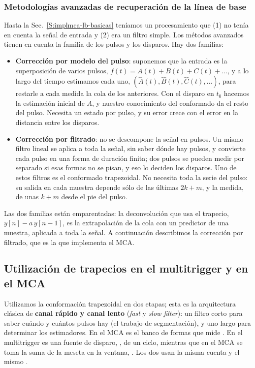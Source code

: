 \subsubsection{Metodologías avanzadas de recuperación de la línea de base}
\label{S:implmca-lb-avanzadas}

Hasta la Sec.~\ref{S:implmca-lb-basicas} teníamos un procesamiento que (1) no tenía en cuenta
la señal de entrada y (2) era un filtro simple. Los métodos avanzados tienen en
cuenta la familia de los pulsos y los disparos. Hay dos familias:
\begin{itemize}
  \item \textbf{Corrección por modelo del pulso}: suponemos que la entrada es la
    superposición de varios pulsos, $f(t) = A(t) + B(t) + C(t) + \ldots$, y a lo
    largo del tiempo estimamos cada uno, $(\hat A(t), \hat B(t), \hat C(t),
    \ldots)$, para restarle a cada medida la cola de los anteriores. Con el
    disparo en $t_0$ hacemos la estimación inicial de $A$, y nuestro
    conocimiento del conformado da el resto del pulso. Necesita un estado por
    pulso, y su error crece con el error en la distancia entre los disparos.
  \item \textbf{Corrección por filtrado}: no se descompone la señal en pulsos.
    Un mismo filtro lineal se aplica a toda la señal, sin saber dónde hay
    pulsos, y convierte cada pulso en una forma de duración finita; dos pulsos
    se pueden medir por separado si esas formas no se pisan, y eso lo deciden
    los disparos. Uno de estos filtros es el conformado trapezoidal. No necesita
    toda la serie del pulso: su salida en cada muestra depende sólo de las
    últimas $2k+m$, y la medida, de unas $k+m$ desde el pie del pulso.
\end{itemize}

Las dos familias están emparentadas: la deconvolución que usa el trapecio,
$y[n] - a\,y[n-1]$, es la extrapolación de la cola con un predictor de una
muestra, aplicada a toda la señal. A continuación describimos la corrección por
filtrado, que es la que implementa el MCA.

\subsection{Utilización de trapecios en el multitrigger y en el MCA}
\label{S:implmca-rapido-lento}

Utilizamos la conformación trapezoidal en dos etapas; esta es la arquitectura
clásica de \textbf{canal rápido y canal lento} (\emph{fast} y \emph{slow
filter}): un filtro corto para saber cuándo y cuántos pulsos hay (el trabajo de
segmentación), y uno largo para determinar los estimadores. En el MCA es el
banco de formas que mide . En el multitrigger es una fuente de
disparo, , de un ciclo, mientras que en el MCA se toma la
suma de la meseta en la ventana, . Los dos usan la misma cuenta
y el mismo .

